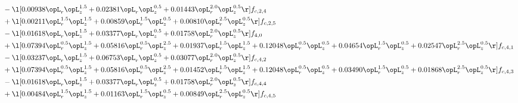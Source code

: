 \begin{alignat}{2}
& - \l[  0.00938 \opL_r \opL_z^{1.5} +  0.02381 \opL_r \opL_z^{0.5} +  0.01443 \opL_r^{2.0} \opL_z^{0.5}  \r] f_{c,2,4} \nonumber \\ 
& + \l[  0.00211 \opL_r^{1.5} \opL_z^{1.5} +  0.00859 \opL_r^{1.5} \opL_z^{0.5} +  0.00810 \opL_r^{2.5} \opL_z^{0.5}  \r] f_{c,2,5} \nonumber \\ 
& - \l[  0.01618 \opL_r \opL_z^{1.5} +  0.03377 \opL_r \opL_z^{0.5} +  0.01758 \opL_r^{2.0} \opL_z^{0.5}  \r] f_{4,0} \nonumber \\ 
& + \l[  0.07394 \opL_r^{0.5} \opL_z^{1.5} +  0.05816 \opL_r^{0.5} \opL_z^{2.5} +  0.01937 \opL_r^{1.5} \opL_z^{1.5} +  0.12048 \opL_r^{0.5} \opL_z^{0.5} +  0.04654 \opL_r^{1.5} \opL_z^{0.5} +  0.02547 \opL_r^{2.5} \opL_z^{0.5}  \r] f_{c,4,1} \nonumber \\ 
& - \l[  0.03237 \opL_r \opL_z^{1.5} +  0.06753 \opL_r \opL_z^{0.5} +  0.03077 \opL_r^{2.0} \opL_z^{0.5}  \r] f_{c,4,2} \nonumber \\ 
& + \l[  0.07394 \opL_r^{0.5} \opL_z^{1.5} +  0.05816 \opL_r^{0.5} \opL_z^{2.5} +  0.01452 \opL_r^{1.5} \opL_z^{1.5} +  0.12048 \opL_r^{0.5} \opL_z^{0.5} +  0.03490 \opL_r^{1.5} \opL_z^{0.5} +  0.01868 \opL_r^{2.5} \opL_z^{0.5}  \r] f_{c,4,3} \nonumber \\ 
& - \l[  0.01618 \opL_r \opL_z^{1.5} +  0.03377 \opL_r \opL_z^{0.5} +  0.01758 \opL_r^{2.0} \opL_z^{0.5}  \r] f_{c,4,4} \nonumber \\ 
& + \l[  0.00484 \opL_r^{1.5} \opL_z^{1.5} +  0.01163 \opL_r^{1.5} \opL_z^{0.5} +  0.00849 \opL_r^{2.5} \opL_z^{0.5}  \r] f_{c,4,5} \nonumber \\ 
\end{alignat} 


